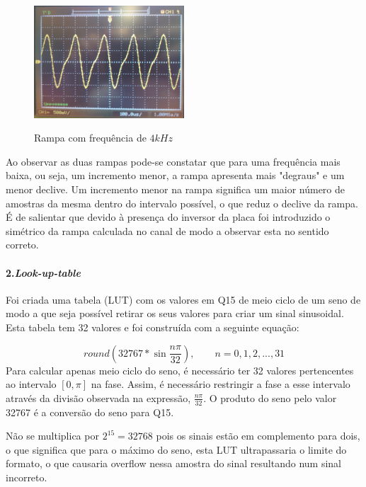 \documentclass[11pt]{article}
\numberwithin{equation}{section}
\begin{document}
\begin{figure}[H]
	\centering
	\includegraphics[width=0.5\textwidth]{./P1_4kHz}~\\
	\caption{Rampa com frequência de $ 4 kHz $}
\end{figure}

Ao observar as duas rampas pode-se constatar que para uma frequência mais baixa, ou seja, um incremento menor, a rampa apresenta mais "degraus" e um menor declive. Um incremento menor na rampa significa um maior número de amostras da mesma dentro do intervalo possível, o que reduz o declive da rampa. É de salientar que devido à presença do inversor da placa foi introduzido o simétrico da rampa calculada no canal de modo a observar esta no sentido correto.
\paragraph{2.\textit{Look-up-table}} \hspace{0pt}

Foi criada uma tabela (LUT) com os valores em Q15 de meio ciclo de um seno de modo a que seja possível retirar os seus valores para criar um sinal sinusoidal. Esta tabela tem 32 valores e foi construída com a seguinte equação:

\begin{equation}
round \left(32767*\sin \dfrac{n \pi}{32} \right),  \quad \quad n=0,1,2,...,31
\end{equation}
Para calcular apenas meio ciclo do seno, é necessário ter 32 valores pertencentes ao intervalo $[0,\pi]$ na fase. Assim, é necessário restringir a fase a esse intervalo através da divisão observada na expressão, $\frac{n \pi}{32}$. O produto do seno pelo valor 32767 é a conversão do seno para Q15. 

Não se multiplica por $2 ^{15}=32768$ pois os sinais estão em complemento para dois, o que significa que para o máximo do seno, esta LUT ultrapassaria o limite do formato, o que causaria overflow nessa amostra do sinal resultando num sinal incorreto. 
\end{document}
